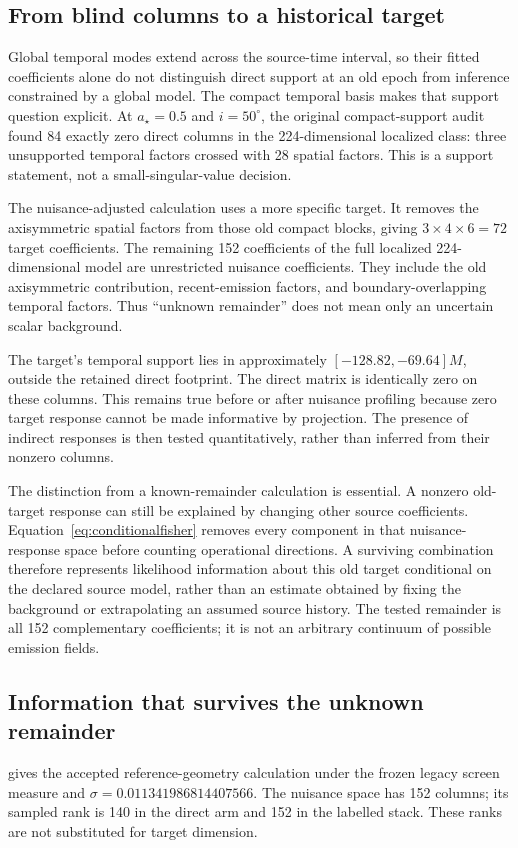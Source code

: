 \subsection{From blind columns to a historical target}
Global temporal modes extend across the source-time interval, so their fitted coefficients alone do not distinguish direct support at an old epoch from inference constrained by a global model. The compact temporal basis makes that support question explicit. At $a_\star=0.5$ and $i=50^\circ$, the original compact-support audit found 84 exactly zero direct columns in the 224-dimensional localized class: three unsupported temporal factors crossed with 28 spatial factors. This is a support statement, not a small-singular-value decision.

The nuisance-adjusted calculation uses a more specific target. It removes the axisymmetric spatial factors from those old compact blocks, giving $3\times4\times6=72$ target coefficients. The remaining 152 coefficients of the full localized 224-dimensional model are unrestricted nuisance coefficients. They include the old axisymmetric contribution, recent-emission factors, and boundary-overlapping temporal factors. Thus ``unknown remainder'' does not mean only an uncertain scalar background.

The target's temporal support lies in approximately $[-128.82,-69.64]M$, outside the retained direct footprint. The direct matrix is identically zero on these columns. This remains true before or after nuisance profiling because zero target response cannot be made informative by projection. The presence of indirect responses is then tested quantitatively, rather than inferred from their nonzero columns.

The distinction from a known-remainder calculation is essential. A nonzero old-target response can still be explained by changing other source coefficients. Equation~\eqref{eq:conditionalfisher} removes every component in that nuisance-response space before counting operational directions. A surviving combination therefore represents likelihood information about this old target conditional on the declared source model, rather than an estimate obtained by fixing the background or extrapolating an assumed source history. The tested remainder is all 152 complementary coefficients; it is not an arbitrary continuum of possible emission fields.

\subsection{Information that survives the unknown remainder}
 gives the accepted reference-geometry calculation under the frozen legacy screen measure and $\sigma=0.011341986814407566$. The nuisance space has 152 columns; its sampled rank is 140 in the direct arm and 152 in the labelled stack. These ranks are not substituted for target dimension.

